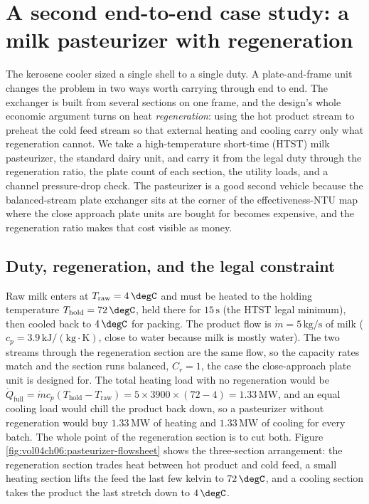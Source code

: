 \section{A second end-to-end case study: a milk pasteurizer with regeneration}

The kerosene cooler sized a single shell to a single duty. A plate-and-frame
unit changes the problem in two ways worth carrying through end to end. The
exchanger is built from several sections on one frame, and the design's whole
economic argument turns on heat \emph{regeneration}: using the hot product
stream to preheat the cold feed stream so that external heating and cooling carry
only what regeneration cannot. We take a high-temperature short-time (HTST) milk
pasteurizer, the standard dairy unit, and carry it from the legal duty through
the regeneration ratio, the plate count of each section, the utility loads, and a
channel pressure-drop check. The pasteurizer is a good second vehicle because the
balanced-stream plate exchanger sits at the corner of the effectiveness-NTU map
where the close approach plate units are bought for becomes expensive, and the
regeneration ratio makes that cost visible as money.

\subsection{Duty, regeneration, and the legal constraint}

Raw milk enters at $T_{\text{raw}} = 4\,\degC$ and must be heated to the holding
temperature $T_{\text{hold}} = 72\,\degC$, held there for $15\,\text{s}$ (the
HTST legal minimum), then cooled back to $4\,\degC$ for packing. The product flow
is $\dot{m} = 5\,\text{kg/s}$ of milk ($c_p = 3.9\,\text{kJ}/(\text{kg}\cdot
\si{\kelvin})$, close to water because milk is mostly water). The two streams
through the regeneration section are the same flow, so the capacity rates match
and the section runs balanced, $C_r = 1$, the case the close-approach plate unit
is designed for. The total heating load with no regeneration would be $\dot{Q}_
{\text{full}} = \dot{m} c_p (T_{\text{hold}} - T_{\text{raw}}) = 5\times 3900
\times (72 - 4) = 1.33\,\text{MW}$, and an equal cooling load would chill the
product back down, so a pasteurizer without regeneration would buy
$1.33\,\text{MW}$ of heating and $1.33\,\text{MW}$ of cooling for every batch.
The whole point of the regeneration section is to cut both. Figure
\ref{fig:vol04ch06:pasteurizer-flowsheet} shows the three-section arrangement:
the regeneration section trades heat between hot product and cold feed, a small
heating section lifts the feed the last few kelvin to $72\,\degC$, and a cooling
section takes the product the last stretch down to $4\,\degC$.

